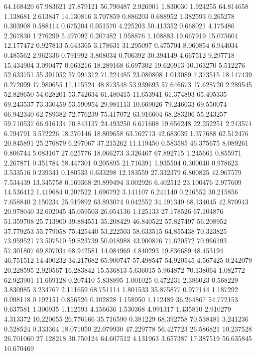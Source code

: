 64.168420
67.983621
27.879121
56.790487
2.926901
1.830030
1.924255
64.814658
1.138681
2.613847
14.130816
3.707859
0.886203
0.688952
1.382593
0.265278
0.303908
0.588114
0.675204
0.051570
4.225203
50.413352
0.668021
4.175486
2.267830
1.276299
5.497092
0.207482
1.958876
1.108883
19.667919
15.075604
12.177472
0.927813
5.643365
3.178631
31.295097
0.475704
8.060854
6.944034
0.485562
2.962336
0.791992
3.808034
0.706392
30.394149
4.667512
9.297718
15.434904
3.090477
0.663216
18.289168
6.697302
19.620913
10.163270
5.512276
52.633751
55.391052
57.991312
71.224485
23.080808
1.013089
7.373515
18.147439
0.272099
17.980655
11.115524
48.873548
53.939693
57.646673
17.628720
2.289545
52.828650
54.028201
53.742634
61.480415
11.653941
61.374893
65.405335
69.243537
73.330459
53.590954
29.981113
10.669026
79.246633
69.550074
66.942340
62.789382
72.776239
75.417072
63.916604
68.283206
55.243257
59.710537
66.916134
70.843137
24.493250
6.671608
19.656248
22.252251
2.243574
6.794791
3.572226
18.270146
18.809658
63.762713
42.683039
1.377688
62.512476
20.845891
25.276879
6.297067
37.215262
11.119450
0.583585
46.375675
8.089261
0.806744
5.083167
27.625776
18.066273
3.326467
67.892715
1.245661
0.855971
2.267871
0.351784
58.447301
0.205895
21.716391
1.935504
0.300040
0.978623
3.533516
0.239341
0.180533
0.633298
12.183559
27.332379
6.800825
42.967579
7.534439
13.345758
0.169368
29.899494
3.002926
6.402512
23.100476
2.977609
14.536412
1.419684
0.207522
1.696792
3.141107
6.241140
0.216552
30.215856
7.658840
2.150234
25.919892
63.893074
0.042552
34.191349
68.134045
42.870943
20.978040
32.602045
45.059503
26.054136
1.125133
27.178526
67.104876
51.359708
25.713900
39.884551
35.208429
46.840522
57.827497
56.208952
37.779253
55.779058
75.425440
53.222503
58.633515
64.855438
70.323825
73.959521
73.507510
59.823739
50.018988
43.900876
71.620572
70.966193
57.301807
69.807034
68.942581
14.084969
4.840293
19.836689
48.453194
46.751512
14.400232
34.217682
65.900747
57.498547
54.920545
4.567425
0.242079
20.228595
2.920567
16.283842
15.536813
5.636015
5.964872
70.138064
1.082772
62.923901
11.669128
0.207410
5.838895
1.001025
0.472231
2.386023
0.568229
3.830985
3.234767
2.111659
68.751114
1.801533
35.875877
0.977144
1.187292
0.098118
0.192151
0.856526
0.102828
1.158950
1.112489
36.264867
54.772153
0.637581
1.300935
1.112593
4.156636
1.530368
4.991317
1.435810
2.910279
4.313372
10.220655
26.776166
35.716590
0.381229
68.392758
70.538481
3.241236
0.528524
0.333364
18.071050
22.079930
47.229778
56.427723
26.586821
10.237528
26.701060
27.128218
30.750124
64.607512
4.131963
3.657387
17.387519
56.635845
10.670469

